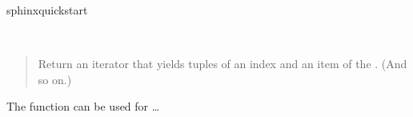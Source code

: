 \documentclass[letterpaper,10pt,french]{sphinxmanual}
\begin{document}
%
\begin{sphinxVerbatim}[commandchars=\\\{\}]
\PYGZdl{} sphinx\PYGZhy{}quickstart
\end{sphinxVerbatim}

\begin{fulllineitems}
\label{\detokenize{01-intro:enumerate}}~\begin{quote}

Return an iterator that yields tuples of an index and an item of the
. (And so on.)
\end{quote}

The {\hyperref[\detokenize{01-intro:enumerate}]{}} function can be used for …

\end{fulllineitems}
\end{document}
